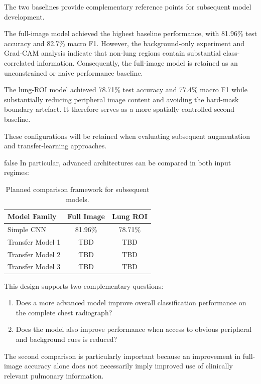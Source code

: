 The two baselines provide complementary reference points for subsequent model
development.

The full-image model achieved the highest baseline performance, with 81.96\%
test accuracy and 82.7\% macro F1. However, the background-only experiment and
Grad-CAM analysis indicate that non-lung regions contain substantial
class-correlated information. Consequently, the full-image model is retained
as an unconstrained or naive performance baseline.

The lung-ROI model achieved 78.71\% test accuracy and 77.4\% macro F1 while
substantially reducing peripheral image content and avoiding the hard-mask
boundary artefact. It therefore serves as a more spatially controlled second
baseline.

These configurations will be retained when evaluating subsequent augmentation
and transfer-learning approaches. 

\if false
In particular, advanced architectures can be
compared in both input regimes:

\begin{table}[H]
\centering
\caption{Planned comparison framework for subsequent models.}
\label{tab:future_model_comparison}
\begin{tabular}{lcc}
\toprule
\textbf{Model Family} & \textbf{Full Image} & \textbf{Lung ROI} \\
\midrule
Simple CNN        & 81.96\% & 78.71\% \\
Transfer Model 1  & TBD & TBD \\
Transfer Model 2  & TBD & TBD \\
Transfer Model 3  & TBD & TBD \\
\bottomrule
\end{tabular}
\end{table}

\fi

This design supports two complementary questions:

\begin{enumerate}
    \item Does a more advanced model improve overall classification performance
    on the complete chest radiograph?
    \item Does the model also improve performance when access to obvious
    peripheral and background cues is reduced?
\end{enumerate}

The second comparison is particularly important because an improvement in
full-image accuracy alone does not necessarily imply improved use of
clinically relevant pulmonary information.